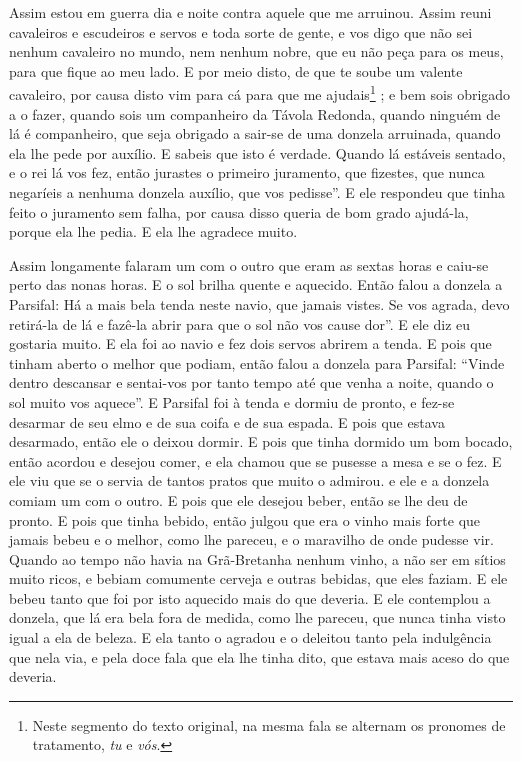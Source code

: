 Assim estou em guerra dia e noite contra aquele que me arruinou. Assim reuni
cavaleiros e escudeiros e servos e toda sorte de gente, e vos digo que não sei
nenhum cavaleiro no mundo, nem nenhum nobre, que eu não peça para os meus, para
que fique ao meu lado. E por meio disto, de que te soube um valente cavaleiro,
por causa disto vim para cá para que me ajudais\footnote{ Neste segmento do
texto original, na mesma fala se alternam os pronomes de tratamento,
\textit{tu} e \textit{vós}.} ; e bem sois obrigado a o fazer,
quando sois um companheiro da Távola Redonda, quando ninguém de lá é
companheiro, que seja obrigado a sair-se de uma donzela arruinada, quando ela
lhe pede por auxílio. E sabeis que isto é verdade. Quando lá estáveis sentado,
e o rei lá vos fez, então jurastes o primeiro juramento, que fizestes, que
nunca negaríeis a nenhuma donzela auxílio, que vos pedisse”. E ele respondeu
que tinha feito o juramento sem falha, por causa disso queria de bom grado
ajudá-la, porque ela lhe pedia. E ela lhe agradece muito.

Assim longamente falaram um com o outro que eram as sextas horas e caiu-se
perto das nonas horas. E o sol brilha quente e aquecido. Então falou a donzela
a Parsifal: Há a mais bela tenda neste navio, que jamais vistes. Se vos
agrada, devo retirá-la de lá e fazê-la abrir para que o sol não vos cause dor”.
E ele diz eu gostaria muito. E ela foi ao navio e fez dois servos abrirem a
tenda. E pois que tinham aberto o melhor que podiam, então falou a donzela para
Parsifal: “Vinde dentro descansar e sentai-vos por tanto tempo até que venha a
noite, quando o sol muito vos aquece”. E Parsifal foi à tenda e dormiu de
pronto, e fez-se desarmar de seu elmo e de sua coifa e de sua espada. E pois
que estava desarmado, então ele o deixou dormir. E pois que tinha dormido um
bom bocado, então acordou e desejou comer, e ela chamou que se pusesse a mesa e
se o fez. E ele viu que se o servia de tantos pratos que muito o admirou. e ele
e a donzela comiam um com o outro. E pois que ele desejou beber, então se lhe
deu de pronto. E pois que tinha bebido, então julgou que era o vinho mais forte
que jamais bebeu e o melhor, como lhe pareceu, e o maravilho de onde pudesse
vir. Quando ao tempo não havia na Grã-Bretanha nenhum vinho, a não ser em
sítios muito ricos, e bebiam comumente cerveja e outras bebidas, que eles
faziam. E ele bebeu tanto que foi por isto aquecido mais do que
deveria. E ele contemplou a donzela, que lá era bela fora de medida, como lhe
pareceu, que nunca tinha visto igual a ela de beleza. E ela tanto o agradou e o
deleitou tanto pela indulgência que nela via, e pela doce fala que ela lhe
tinha dito, que estava mais aceso do que deveria.

